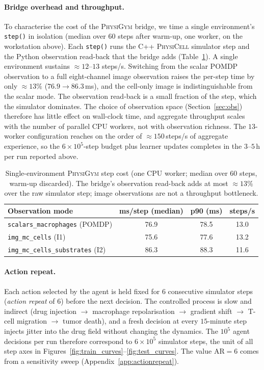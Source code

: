 \documentclass{article}
\newcommand{\physigym}{\textsc{PhysiGym}}
\newcommand{\physicell}{\textsc{PhysiCell}}
\begin{document}
\paragraph{Bridge overhead and throughput.}
To characterise the cost of the \physigym{} bridge, we time a single
environment's \texttt{step()} in isolation (median over $60$ steps after warm-up,
one worker, on the workstation above). Each \texttt{step()} runs the C++
\physicell{} simulator step and the Python observation read-back that the bridge
adds (Table~\ref{tab:throughput}). A single environment sustains
${\approx}12$--$13$ steps/s. Switching from the scalar POMDP observation to a
full eight-channel image observation raises the per-step time by only
${\approx}13\%$ ($76.9\!\to\!86.3$\,ms), and the cell-only image is
indistinguishable from the scalar mode. The observation read-back is a small
fraction of the step, which the simulator dominates. The choice of observation
space (Section~\ref{sec:obs}) therefore has little effect on wall-clock time,
and aggregate throughput scales with the number of parallel CPU workers, not
with observation richness. The $13$-worker configuration reaches on the
order of ${\approx}150$\,steps/s of aggregate experience, so the
$6\!\times\!10^5$-step budget plus learner updates completes in the
$3$--$5$\,h per run reported above.

\begin{table}[h]
  \centering\small
  \caption{Single-environment \physigym{} step cost (one CPU worker; median over
    $60$ steps, warm-up discarded). The bridge's observation read-back adds at
    most ${\approx}13\%$ over the raw simulator step; image observations are not a
    throughput bottleneck.}
  \label{tab:throughput}
  \begin{tabular}{lccc}
    \toprule
    \textbf{Observation mode} & \textbf{ms/step (median)} & \textbf{p90 (ms)} & \textbf{steps/s} \\
    \midrule
    \texttt{scalars\_macrophages} (POMDP) & 76.9 & 78.5 & 13.0 \\
    \texttt{img\_mc\_cells} (I1)          & 75.6 & 77.6 & 13.2 \\
    \texttt{img\_mc\_cells\_substrates} (I2) & 86.3 & 88.3 & 11.6 \\
    \bottomrule
  \end{tabular}
\end{table}

\paragraph{Action repeat.}
Each action selected by the agent is held fixed for $6$ consecutive simulator
steps (\emph{action repeat} of $6$) before the next decision. The controlled
process is slow and indirect (drug injection $\to$ macrophage repolarisation
$\to$ gradient shift $\to$ T-cell migration $\to$ tumor death), and a fresh
decision at every $15$-minute step injects jitter into the drug field without
changing the dynamics. The $10^5$ agent decisions per run therefore correspond
to $6\!\times\!10^5$ simulator steps, the unit of all step axes in
Figures~\ref{fig:train_curves}--\ref{fig:test_curves}. The value AR$=6$ comes
from a sensitivity sweep (Appendix~\ref{app:actionrepeat}).
\end{document}
